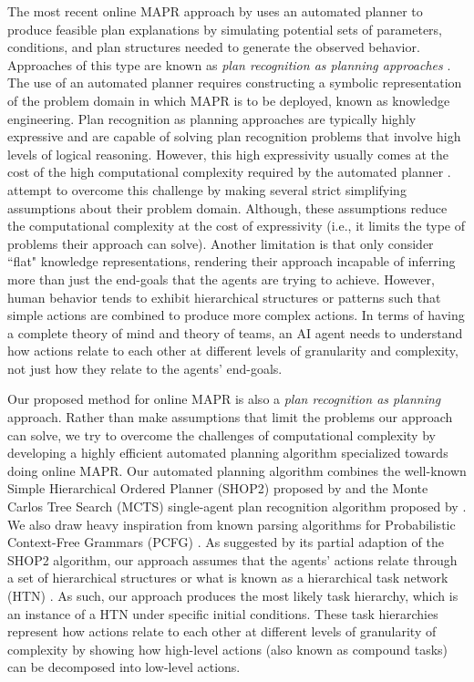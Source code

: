 The most recent online MAPR approach by \citet{Argenta_Doyle_2017} uses an automated planner to produce feasible plan explanations by simulating potential sets of parameters, conditions, and plan structures needed to generate the observed behavior. Approaches of this type are known as \textit{plan recognition as planning approaches} \citep{Ramirez_Geffner_2009,Van-Horenbeke_Peer_2021}. The use of an automated planner requires constructing a symbolic representation of the problem domain in which MAPR is to be deployed, known as knowledge engineering. Plan recognition as planning approaches are typically highly expressive and are capable of solving plan recognition problems that involve high levels of logical reasoning. However, this high expressivity usually comes at the cost of the high computational complexity required by the automated planner \citep{Van-Horenbeke_Peer_2021}. \citet{Argenta_Doyle_2017} attempt to overcome this challenge by making several strict simplifying assumptions about their problem domain. Although, these assumptions reduce the computational complexity at the cost of expressivity (i.e., it limits the type of problems their approach can solve). Another limitation is that \citet{Argenta_Doyle_2017} only consider ``flat" knowledge representations, rendering their approach incapable of inferring more than just the end-goals that the agents are trying to achieve. However, human behavior tends to exhibit hierarchical structures or patterns such that simple actions are combined to produce more complex actions. In terms of having a complete theory of mind and theory of teams, an AI agent needs to understand how actions relate to each other at different levels of granularity and complexity, not just how they relate to the agents' end-goals.

Our proposed method for online MAPR is also a \textit{plan recognition as planning} approach. Rather than make assumptions that limit the problems our approach can solve, we try to overcome the challenges of computational complexity by developing a highly efficient automated planning algorithm specialized towards doing online MAPR. Our automated planning algorithm combines the well-known Simple Hierarchical Ordered Planner (SHOP2) proposed by \citet{Nau_2003} and the Monte Carlos Tree Search (MCTS) single-agent plan recognition algorithm proposed by \citet{Kantharaju_Ontanon_Geib_2019}. We also draw heavy inspiration from known parsing algorithms for Probabilistic Context-Free Grammars (PCFG) \citep{Collins_2011}. As suggested by its partial adaption of the SHOP2 algorithm, our approach assumes that the agents' actions relate through a set of hierarchical structures or what is known as a hierarchical task network (HTN) \citep{Nau_2003,Russell_Norvig_2021}. As such, our approach produces the most likely task hierarchy, which is an instance of a HTN under specific initial conditions. These task hierarchies represent how actions relate to each other at different levels of granularity of complexity by showing how high-level actions (also known as compound tasks) can be decomposed into low-level actions.

